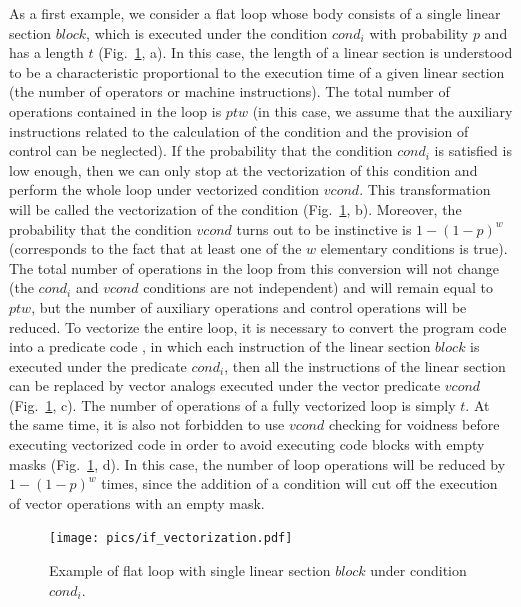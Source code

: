 \documentclass[
11pt,%
tightenlines,%
twoside,%
onecolumn,%
nofloats,%
nobibnotes,%
nofootinbib,%
superscriptaddress,%
noshowpacs,%
centertags]%
{revtex4}
\begin{document}
As a first example, we consider a flat loop whose body consists of a single linear section $block$, which is executed under the condition $cond_i$ with probability $p$ and has a length $t$ (Fig.~\ref{fig:flat_loop_1}, a).
In this case, the length of a linear section is understood to be a characteristic proportional to the execution time of a given linear section (the number of operators or machine instructions).
The total number of operations contained in the loop is $ptw$ (in this case, we assume that the auxiliary instructions related to the calculation of the condition and the provision of control can be neglected).
If the probability that the condition $cond_i$ is satisfied is low enough, then we can only stop at the vectorization of this condition and perform the whole loop under vectorized condition $vcond$.
This transformation will be called the vectorization of the condition (Fig.~\ref{fig:flat_loop_1}, b).
Moreover, the probability that the condition $vcond$ turns out to be instinctive is $1 - (1 - p) ^ w$ (corresponds to the fact that at least one of the $w$ elementary conditions is true).
The total number of operations in the loop from this conversion will not change (the $cond_i$ and $vcond$ conditions are not independent) and will remain equal to $ptw$, but the number of auxiliary operations and control operations will be reduced.
To vectorize the entire loop, it is necessary to convert the program code into a predicate code \cite{Scott_Predct,Hwu_Predct}, in which each instruction of the linear section $block$ is executed under the predicate $cond_i$, then all the instructions of the linear section can be replaced by vector analogs executed under the vector predicate $vcond$ (Fig.~\ref{fig:flat_loop_1}, c).
The number of operations of a fully vectorized loop is simply $t$.
At the same time, it is also not forbidden to use $vcond$ checking for voidness before executing vectorized code in order to avoid executing code blocks with empty masks (Fig.~\ref{fig:flat_loop_1}, d).
In this case, the number of loop operations will be reduced by $1 - (1 - p) ^ w$ times, since the addition of a condition will cut off the execution of vector operations with an empty mask.

\begin{figure}[h]
\setcaptionmargin{5mm}
\onelinecaptionstrue
\texttt{[image: pics/if\_vectorization.pdf]}
\caption{Example of flat loop with single linear section $block$ under condition $cond_i$.}
\label{fig:flat_loop_1}
\end{figure}
\end{document}
